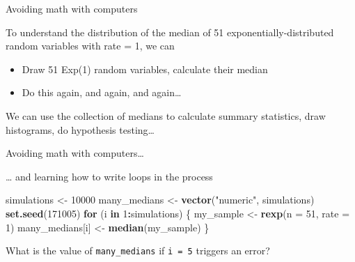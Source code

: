 \documentclass[ignorenonframetext,]{beamer}
\newenvironment{Shaded}{\begin{snugshade}}{\end{snugshade}}
\newcommand{\ControlFlowTok}[1]{\textcolor[rgb]{0.13,0.29,0.53}{\textbf{#1}}}
\newcommand{\DataTypeTok}[1]{\textcolor[rgb]{0.13,0.29,0.53}{#1}}
\newcommand{\DecValTok}[1]{\textcolor[rgb]{0.00,0.00,0.81}{#1}}
\newcommand{\KeywordTok}[1]{\textcolor[rgb]{0.13,0.29,0.53}{\textbf{#1}}}
\newcommand{\NormalTok}[1]{#1}
\newcommand{\OperatorTok}[1]{\textcolor[rgb]{0.81,0.36,0.00}{\textbf{#1}}}
\newcommand{\StringTok}[1]{\textcolor[rgb]{0.31,0.60,0.02}{#1}}
\providecommand{\tightlist}{%
  \setlength{\itemsep}{0pt}\setlength{\parskip}{0pt}}
\begin{document}
\begin{frame}{Avoiding math with computers}
\protect\hypertarget{avoiding-math-with-computers}{}

To understand the distribution of the median of 51
exponentially-distributed random variables with rate = 1, we can

\begin{itemize}
\tightlist
\item
  Draw 51 Exp(1) random variables, calculate their median
\item
  Do this again, and again, and again\ldots{}
\end{itemize}

We can use the collection of medians to calculate summary statistics,
draw histograms, do hypothesis testing\ldots{}

\end{frame}

\begin{frame}[fragile]{Avoiding math with computers\ldots{}}
\protect\hypertarget{avoiding-math-with-computers-1}{}

\ldots{} and learning how to write loops in the process

\begin{Shaded}
\begin{Highlighting}[]
\NormalTok{simulations <-}\StringTok{ }\DecValTok{10000}
\NormalTok{many_medians <-}\StringTok{ }\KeywordTok{vector}\NormalTok{(}\StringTok{"numeric"}\NormalTok{, simulations)}
\KeywordTok{set.seed}\NormalTok{(}\DecValTok{171005}\NormalTok{)}
\ControlFlowTok{for}\NormalTok{ (i }\ControlFlowTok{in} \DecValTok{1}\OperatorTok{:}\NormalTok{simulations) \{}
\NormalTok{  my_sample <-}\StringTok{ }\KeywordTok{rexp}\NormalTok{(}\DataTypeTok{n =} \DecValTok{51}\NormalTok{, }\DataTypeTok{rate =} \DecValTok{1}\NormalTok{)}
\NormalTok{  many_medians[i] <-}\StringTok{ }\KeywordTok{median}\NormalTok{(my_sample)}
\NormalTok{\}}
\end{Highlighting}
\end{Shaded}

What is the value of \texttt{many\_medians} if \texttt{i\ =\ 5} triggers
an error?

\end{frame}
\end{document}
